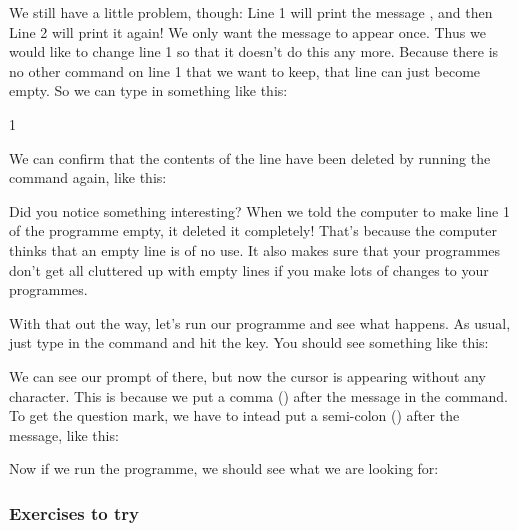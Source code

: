 
\needspace{3cm}
We still have a little problem, though: Line 1 will print the message
, and then Line 2 will print it again!
We only want the message to appear once. Thus we would like to change
line 1 so that it doesn't do this any more.  Because there is no other
command on line 1 that we want to keep, that line can just become
empty. So we can type in something like this:

\begin{screenoutput}
1
\end{screenoutput}

\needspace{4cm}
We can confirm that the contents of the line have been deleted by
running the  command again, like this:


Did you notice something interesting? When we told the computer to
make line 1 of the programme empty, it deleted it completely!
That's because the computer thinks that an empty line is of no use.
It also makes sure that your programmes don't get all cluttered up
with empty lines if you make lots of changes to your programmes.

\needspace{4cm}
With that out the way, let's run our programme and see what happens.
As usual, just type in the  command and hit the
 key.  You should see something like this:


\needspace{2.5cm}
We can see our prompt of  there, but
now the cursor is appearing without any  character. This is
because we put a comma (\stw{,}) after the message in the 
command.  To get the question mark, we have to intead put a
semi-colon (\stw{;}) after the message, like this:


\needspace{4cm}
Now if we run the programme, we should see what we are looking for:


  \subsubsection{Exercises to try}

